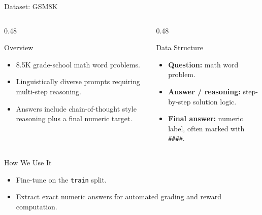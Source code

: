 \documentclass[aspectratio=169,11pt]{beamer}
\newcommand{\tightitems}{\setlength{\itemsep}{0.25em}\setlength{\parskip}{0pt}}
\begin{document}
\begin{frame}{Dataset: GSM8K}
\begin{columns}[T,onlytextwidth]
  \begin{column}{0.48\textwidth}
    \begin{block}{Overview}
      \begin{itemize}\tightitems
        \item 8.5K grade-school math word problems.
        \item Linguistically diverse prompts requiring multi-step reasoning.
        \item Answers include chain-of-thought style reasoning plus a final numeric target.
      \end{itemize}
    \end{block}
  \end{column}
  \begin{column}{0.48\textwidth}
    \begin{block}{Data Structure}
      \begin{itemize}\tightitems
        \item \textbf{Question:} math word problem.
        \item \textbf{Answer / reasoning:} step-by-step solution logic.
        \item \textbf{Final answer:} numeric label, often marked with \texttt{\#\#\#\#}.
      \end{itemize}
    \end{block}
  \end{column}
\end{columns}

\vspace{0.8em}
\begin{block}{How We Use It}
\begin{itemize}\tightitems
  \item Fine-tune on the \texttt{train} split.
  \item Extract exact numeric answers for automated grading and reward computation.
\end{itemize}
\end{block}
\end{frame}
\end{document}
